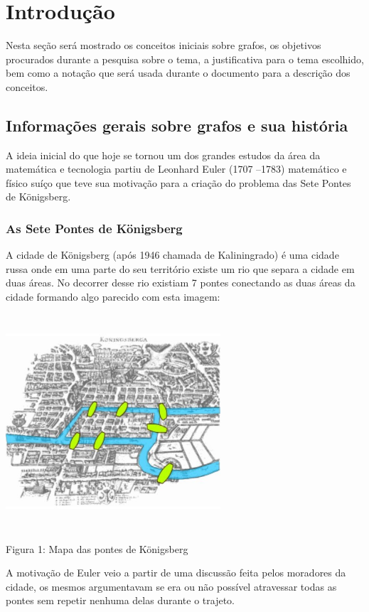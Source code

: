 \documentclass[12pt]{article}
\begin{document}
	\section{Introdução}
	Nesta seção será mostrado os conceitos iniciais sobre grafos, os objetivos procurados durante a pesquisa sobre o tema, a justificativa para o tema escolhido, bem como a notação que será usada durante o documento para a descrição dos conceitos.
	
	\subsection{Informações gerais sobre grafos e sua história }
	
	A ideia inicial do que hoje se tornou um dos grandes estudos da área da matemática e tecnologia partiu de Leonhard Euler (1707 –1783) matemático e físico suíço que teve sua motivação para a criação do problema das Sete Pontes de Königsberg.
	
	\subsubsection{As Sete Pontes de Königsberg }
	
	A cidade de Königsberg (após 1946 chamada de Kaliningrado) é uma cidade russa onde em uma parte do seu território existe um rio que separa a cidade em duas áreas. No decorrer desse rio existiam 7 pontes conectando as duas áreas da cidade formando algo parecido com esta imagem:

 
{\centering  \includegraphics[width=8cm, height=8cm]{pontesKonisberg}\par}   


    Figura 1: Mapa das pontes de Königsberg
   
    A motivação de Euler veio a partir de uma discussão feita pelos moradores da cidade, os mesmos argumentavam se era ou não possível atravessar todas as pontes sem repetir nenhuma delas durante o trajeto.
   
\end{document}

